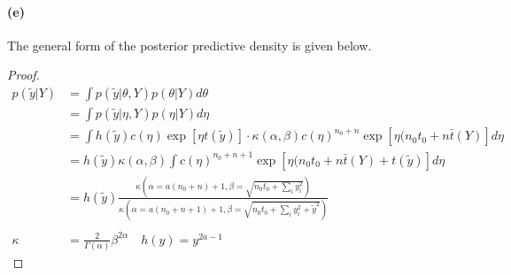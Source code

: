 \documentclass[11pt, letterpaper]{article}
\begin{document}
\paragraph{(e)}
The general form of the posterior predictive density is given below.
\begin{proof}
\begin{align*}
    p(\tilde{y}|Y) &= \int p(\tilde{y}|\theta, Y) p(\theta|Y) d\theta \\
        &= \int p(\tilde{y}|\eta, Y) p(\eta|Y) d\eta \\
        &= \int h(\tilde{y})c(\eta)\exp[\eta t(\tilde{y})] \cdot \kappa(\alpha, \beta)c(\eta)^{n_0+n} \exp[\eta(n_0t_0+n\bar{t}(Y)] d\eta \\
        &= h(\tilde{y}) \kappa(\alpha, \beta) \int c(\eta)^{n_0+n+1} \exp[\eta(n_0t_0+n\bar{t}(Y)+t(\tilde{y})] d\eta \\
        &= h(\tilde{y}) 
            \frac{\kappa(\alpha=a(n_0+n)+1, \beta=\sqrt{n_0t_0 + \sum_i y_i^2})}
                 {\kappa(\alpha=a(n_0+n+1)+1, \beta=\sqrt{n_0t_0 + \sum_i y_i^2 + \tilde{y}^2})} \\ \\
    \kappa &= \frac{2}{\Gamma(\alpha)} \beta^{2\alpha} \quad h(y) = y^{2a-1}
\end{align*}
\end{proof}
\end{document}
